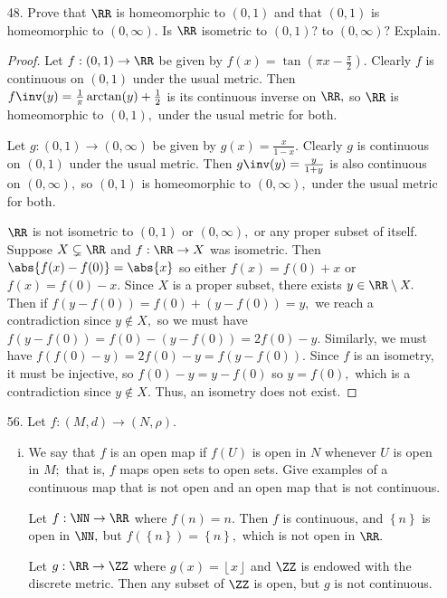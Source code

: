 \documentclass{article}
\begin{document}
\begin{itemize}
	\item[48.] Prove that $\RR$ is homeomorphic to $(0, 1)$ and that $(0, 1)$ is homeomorphic to $(0, \infty).$ Is $\RR$ isometric to $(0, 1)?$ to $(0, \infty)?$ Explain.
		\begin{proof}
			Let $f:(0, 1)\to\RR$ be given by $f(x)=\tan\left( \pi x-\frac{\pi}{2} \right).$ Clearly $f$ is continuous on $(0, 1)$ under the usual metric. Then $f\inv(y)=\frac{1}{\pi}\arctan(y)+\frac{1}{2}$ is its continuous inverse on $\RR,$ so $\RR$ is homeomorphic to $(0, 1),$ under the usual metric for both. 

			Let $g:(0, 1)\to(0, \infty)$ be given by $g(x)=\frac{x}{1-x}.$ Clearly $g$ is continuous on $(0, 1)$ under the usual metric. Then $g\inv(y)=\frac{y}{1+y}$ is also continuous on $(0, \infty),$ so $(0, 1)$ is homeomorphic to $(0, \infty),$ under the usual metric for both.

			$\RR$ is not isometric to $(0, 1)$ or $(0, \infty),$ or any proper subset of itself. Suppose $X\subsetneq \RR$ and $f:\RR\to X$ was isometric. Then $\abs{f(x)-f(0)}=\abs{x}$ so either $f(x)=f(0)+x$ or $f(x)=f(0)-x.$ Since $X$ is a proper subset, there exists $y\in \RR\setminus X.$ Then if $f(y-f(0))=f(0)+(y-f(0)) = y,$ we reach a contradiction since $y\not\in X,$ so we must have $f(y-f(0)) = f(0)-(y-f(0)) = 2f(0)-y.$ Similarly, we must have $f(f(0)-y)=2f(0)-y=f(y-f(0)).$ Since $f$ is an isometry, it must be injective, so $f(0)-y=y-f(0)$ so $y=f(0),$ which is a contradiction since $y\not\in X.$ Thus, an isometry does not exist.
		\end{proof}

	\item[56.] Let $f:(M, d)\to (N, \rho).$
		\begin{enumerate}[(i)]
			\item We say that $f$ is an open map if $f(U)$ is open in $N$ whenever $U$ is open in $M;$ that is, $f$ maps open sets to open sets. Give examples of a continuous map that is not open and an open map that is not continuous.
				\begin{soln}
					Let $f:\NN\to\RR$ where $f(n)=n.$ Then $f$ is continuous, and $\left\{ n \right\}$ is open in $\NN,$ but $f(\left\{ n \right\}) = \left\{ n \right\},$ which is not open in $\RR.$

					Let $g:\RR\to\ZZ$ where $g(x)=\left\lfloor x \right\rfloor$ and $\ZZ$ is endowed with the discrete metric. Then any subset of $\ZZ$ is open, but $g$ is not continuous.
				\end{soln}


\end{enumerate}
\end{itemize}
\end{document}
